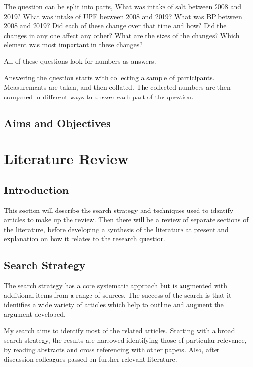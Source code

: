 \documentclass[
]{article}
\begin{document}
The question can be split into parts, What was intake of salt between
2008 and 2019? What was intake of UPF between 2008 and 2019? What was BP
between 2008 and 2019? Did each of these change over that time and how?
Did the changes in any one affect any other? What are the sizes of the
changes? Which element was most important in these changes?

All of these questions look for numbers as answers.

Answering the question starts with collecting a sample of participants.
Measurements are taken, and then collated. The collected numbers are
then compared in different ways to answer each part of the question.

\hypertarget{aims-and-objectives}{%
\subsection{Aims and Objectives}\label{aims-and-objectives}}

\newpage

\hypertarget{literature-review}{%
\section{Literature Review}\label{literature-review}}

\hypertarget{introduction-1}{%
\subsection{Introduction}\label{introduction-1}}

This section will describe the search strategy and techniques used to
identify articles to make up the review. Then there will be a review of
separate sections of the literature, before developing a synthesis of
the literature at present and explanation on how it relates to the
research question.

\hypertarget{search-strategy}{%
\subsection{Search Strategy}\label{search-strategy}}

The search strategy has a core systematic approach but is augmented with
additional items from a range of sources. The success of the search is
that it identifies a wide variety of articles which help to outline and
augment the argument developed.

My search aims to identify most of the related articles. Starting with a
broad search strategy, the results are narrowed identifying those of
particular relevance, by reading abstracts and cross referencing with
other papers. Also, after discussion colleagues passed on further
relevant literature.
\end{document}
